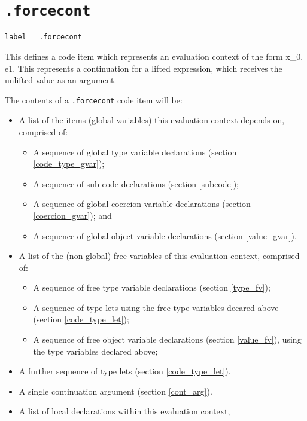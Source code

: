 \documentclass{report}
\newcommand\stringcode[1]{\texttt{#1}}
\begin{document}
\section{\stringcode{.forcecont}}

\begin{verbatim}
label	.forcecont
\end{verbatim}

This defines a code item which represents an evaluation context of the form \< \lfloor{}x_0\rfloor \propto \bullet. e1\>.
This represents a continuation for a lifted expression, which receives the unlifted value as an argument.

The contents of a \stringcode{.forcecont} code item will be:
\begin{itemize}
    \item A list of the items (global variables) this evaluation context depends on, comprised of:
        \begin{itemize}
            \item A sequence of global type variable declarations (section \ref{code_type_gvar});
            \item A sequence of sub-code declarations (section \ref{subcode});
            \item A sequence of global coercion variable declarations (section \ref{coercion_gvar}); and
            \item A sequence of global object variable declarations (section \ref{value_gvar}).
        \end{itemize}
    \item A list of the (non-global) free variables of this evaluation context, comprised of:
        \begin{itemize}
            \item A sequence of free type variable declarations (section \ref{type_fv});
            \item A sequence of type lets using the free type variables decared above (section \ref{code_type_let});
            \item A sequence of free object variable declarations (section \ref{value_fv}), using the type variables declared above;
        \end{itemize}
    \item A further sequence of type lets (section \ref{code_type_let}).
    \item A single continuation argument (section \ref{cont_arg}).
    \item A list of local declarations within this evaluation context,

\end{itemize}
\end{document}
